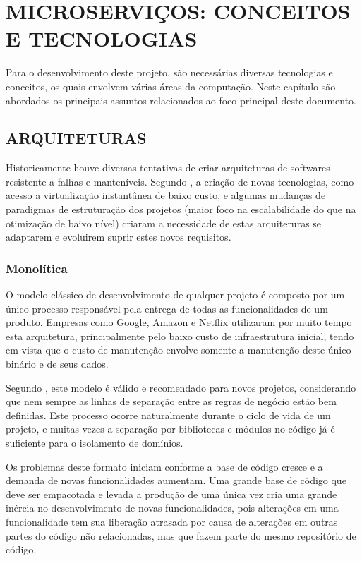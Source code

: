 \chapter{MICROSERVIÇOS: CONCEITOS E TECNOLOGIAS}
\label{chp:tecnologias}

Para o desenvolvimento deste projeto, são necessárias diversas tecnologias e
conceitos, os quais envolvem várias áreas da computação. Neste capítulo são
abordados os principais assuntos relacionados ao foco principal deste documento.

\section{ARQUITETURAS}

Historicamente houve diversas tentativas de criar arquiteturas de softwares
resistente a falhas e manteníveis. Segundo , a
criação de novas tecnologias, como acesso a virtualização instantânea de
baixo custo, e algumas mudanças de paradigmas de estruturação dos projetos
(maior foco na escalabilidade do que na otimização de baixo nível) criaram
a necessidade de estas arquiteruras se adaptarem e evoluirem suprir estes
novos requisitos.

\subsection{Monolítica}

O modelo clássico de desenvolvimento de qualquer projeto é composto por um
único processo responsável pela entrega de todas as funcionalidades de um
produto. Empresas como Google, Amazon e Netflix utilizaram por muito tempo
esta arquitetura, principalmente pelo baixo custo de infraestrutura inicial,
tendo em vista que o custo de manutenção envolve somente a manutenção deste
único binário e de seus dados.

Segundo , este modelo é válido e recomendado para novos
projetos, considerando que nem sempre as linhas de separação entre as regras
de negócio estão bem definidas. Este processo ocorre naturalmente durante o
ciclo de vida de um projeto, e muitas vezes a separação por bibliotecas e
módulos no código já é suficiente para o isolamento de domínios.

Os problemas deste formato iniciam conforme a base de código cresce e a demanda
de novas funcionalidades aumentam. Uma grande base de código que deve ser
empacotada e levada a produção de uma única vez cria uma grande inércia
no desenvolvimento de novas funcionalidades, pois alterações em uma
funcionalidade tem sua liberação atrasada por causa de alterações em
outras partes do código não relacionadas, mas que fazem parte do mesmo
repositório de código.


